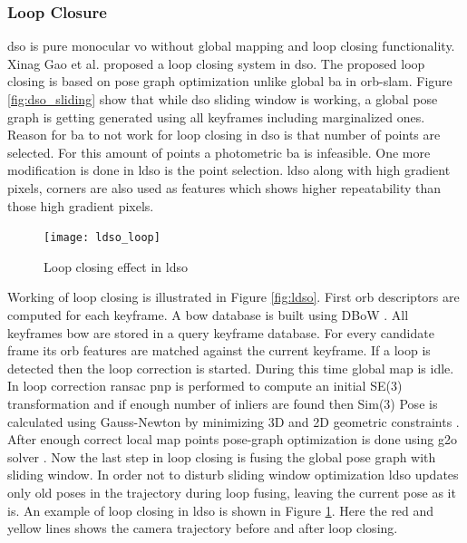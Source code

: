 \subsubsection{Loop Closure}
\acrshort{dso} is pure monocular \acrshort{vo} without global mapping and loop closing functionality. Xinag Gao et al.\cite{gao2018ldso} proposed a loop closing system in \acrshort{dso}. The proposed loop closing is based on pose graph optimization unlike global \acrshort{ba} in \acrshort{orb}-\acrshort{slam}. Figure \ref{fig:dso_sliding} show that while \acrshort{dso} sliding window is working, a global pose graph is getting generated using all keyframes including marginalized ones. Reason for \acrshort{ba} to not work for loop closing in \acrshort{dso} is that number of points are selected. For this amount of points a photometric \acrshort{ba} is infeasible. One more modification is done in \acrshort{ldso} is the point selection. \acrshort{ldso} along with high gradient pixels, corners are also used as features which shows higher repeatability than those high gradient pixels.\\
\begin{figure}[H]
	\centering
	\texttt{[image: ldso\_loop]}
	\caption{Loop closing effect in ldso}
	\label{fig:ldso_loop}
\end{figure}
\noindent Working of loop closing is illustrated in Figure \ref{fig:ldso}. First \acrshort{orb} descriptors are computed for each keyframe. A \acrshort{bow} database is built using DBoW \cite{DboW}. All keyframes \acrshort{bow} are stored in a query keyframe database. For every candidate frame its \acrshort{orb} features are matched against the current keyframe. If a loop is detected then the loop correction is started. During this time global map is idle. In loop correction \acrshort{ransac} \acrshort{pnp} is performed to compute an initial SE(3) transformation and if enough number of inliers are found then Sim(3) Pose is calculated using Gauss-Newton by minimizing 3D and 2D geometric constraints \cite{gao2018ldso}. After enough correct local map points pose-graph optimization is done using g2o solver \cite{g2o}. Now the last step in loop closing is fusing the global pose graph with sliding window. In order not to disturb sliding window optimization \acrshort{ldso} updates only old poses in the trajectory during loop fusing, leaving the current pose as it is. An example of loop closing in \acrshort{ldso} is shown in Figure \ref{fig:ldso_loop}. Here the red and yellow lines shows the camera trajectory before and after loop closing. 

